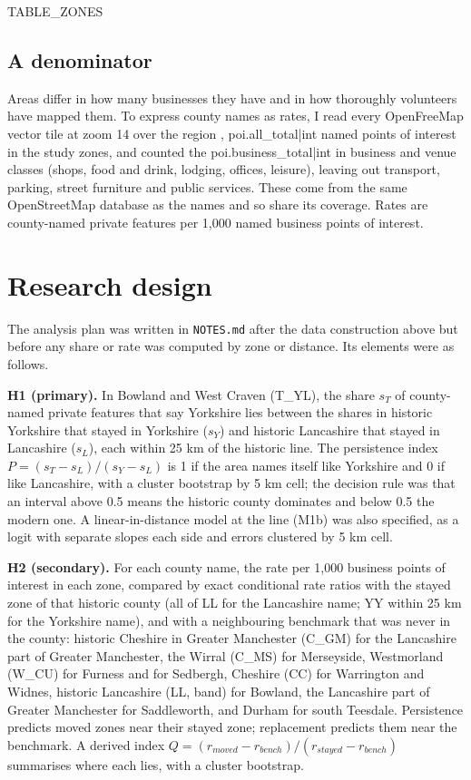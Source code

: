 \documentclass[11pt,a4paper]{article}
\begin{document}
{{TABLE_ZONES}}

\subsection{A denominator}
Areas differ in how many businesses they have and in how thoroughly volunteers have mapped them. To express county names as rates, I read every OpenFreeMap vector tile at zoom 14 over the region \citep{openfreemap2026}, {{poi.all_total|int}} named points of interest in the study zones, and counted the {{poi.business_total|int}} in business and venue classes (shops, food and drink, lodging, offices, leisure), leaving out transport, parking, street furniture and public services. These come from the same OpenStreetMap database as the names and so share its coverage. Rates are county-named private features per 1,000 named business points of interest.

\section{Research design}\label{sec:design}
The analysis plan was written in \texttt{NOTES.md} after the data construction above but before any share or rate was computed by zone or distance. Its elements were as follows.

\textbf{H1 (primary).} In Bowland and West Craven (T\_YL), the share $s_T$ of county-named private features that say Yorkshire lies between the shares in historic Yorkshire that stayed in Yorkshire ($s_Y$) and historic Lancashire that stayed in Lancashire ($s_L$), each within 25 km of the historic line. The persistence index $P=(s_T-s_L)/(s_Y-s_L)$ is 1 if the area names itself like Yorkshire and 0 if like Lancashire, with a cluster bootstrap by 5 km cell; the decision rule was that an interval above 0.5 means the historic county dominates and below 0.5 the modern one. A linear-in-distance model at the line (M1b) was also specified, as a logit with separate slopes each side and errors clustered by 5 km cell.

\textbf{H2 (secondary).} For each county name, the rate per 1,000 business points of interest in each zone, compared by exact conditional rate ratios \citep{clopper1934} with the stayed zone of that historic county (all of LL for the Lancashire name; YY within 25 km for the Yorkshire name), and with a neighbouring benchmark that was never in the county: historic Cheshire in Greater Manchester (C\_GM) for the Lancashire part of Greater Manchester, the Wirral (C\_MS) for Merseyside, Westmorland (W\_CU) for Furness and for Sedbergh, Cheshire (CC) for Warrington and Widnes, historic Lancashire (LL, band) for Bowland, the Lancashire part of Greater Manchester for Saddleworth, and Durham for south Teesdale. Persistence predicts moved zones near their stayed zone; replacement predicts them near the benchmark. A derived index $Q=(r_{moved}-r_{bench})/(r_{stayed}-r_{bench})$ summarises where each lies, with a cluster bootstrap.
\end{document}
